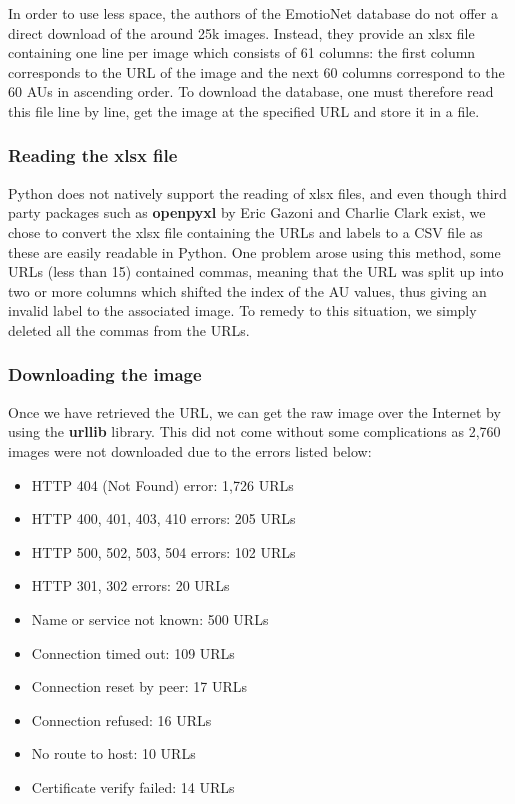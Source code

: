 \documentclass[12pt,twoside]{article}
\begin{document}
In order to use less space, the authors of the EmotioNet database do not offer
a direct download of the  around 25k images. Instead, they provide an xlsx file containing one line per image which consists of 61 columns: the first column corresponds to the URL of the image and the next 60 columns correspond to the 60 AUs in ascending order. To download the database, one must therefore read this file line by line, get the image at the specified URL and store it in a file. 

\subsubsection{Reading the xlsx file}

Python does not natively support the reading of xlsx files, and even though third party packages such as \textbf{openpyxl} by Eric Gazoni and Charlie Clark exist, we chose to convert the xlsx file containing the URLs and labels to a CSV file as these are easily readable in Python. One problem arose using this method, some URLs (less than 15) contained commas, meaning that the URL was split up into two or more columns which shifted the index of the AU values, thus giving an invalid label to the associated image. To remedy to this situation, we simply deleted all the commas from the URLs.

\subsubsection{Downloading the image}

Once we have retrieved the URL, we can get the raw image over the Internet by using the \textbf{urllib} library. This did not come without some complications as 2,760 images were not downloaded due to the errors listed below:

\begin{itemize}
\item HTTP 404 (Not Found) error: 1,726 URLs
\item HTTP 400, 401, 403, 410 errors: 205 URLs
\item HTTP 500, 502, 503, 504 errors: 102 URLs
\item HTTP 301, 302 errors: 20 URLs
\item Name or service not known: 500 URLs
\item Connection timed out: 109 URLs
\item Connection reset by peer: 17 URLs
\item Connection refused: 16 URLs
\item No route to host: 10 URLs
\item Certificate verify failed: 14 URLs
\end{itemize}
\end{document}
